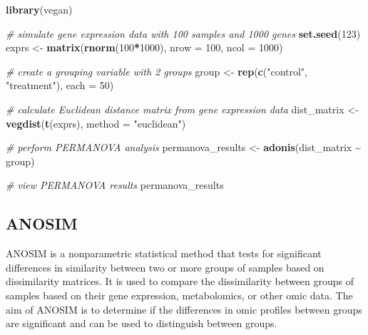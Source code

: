 \documentclass[
]{book}
\newenvironment{Shaded}{\begin{snugshade}}{\end{snugshade}}
\newcommand{\AttributeTok}[1]{\textcolor[rgb]{0.13,0.29,0.53}{#1}}
\newcommand{\CommentTok}[1]{\textcolor[rgb]{0.56,0.35,0.01}{\textit{#1}}}
\newcommand{\DecValTok}[1]{\textcolor[rgb]{0.00,0.00,0.81}{#1}}
\newcommand{\FunctionTok}[1]{\textcolor[rgb]{0.13,0.29,0.53}{\textbf{#1}}}
\newcommand{\NormalTok}[1]{#1}
\newcommand{\OtherTok}[1]{\textcolor[rgb]{0.56,0.35,0.01}{#1}}
\newcommand{\SpecialCharTok}[1]{\textcolor[rgb]{0.81,0.36,0.00}{\textbf{#1}}}
\newcommand{\StringTok}[1]{\textcolor[rgb]{0.31,0.60,0.02}{#1}}
\begin{document}
\small

\begin{Shaded}
\begin{Highlighting}[]
\FunctionTok{library}\NormalTok{(vegan)}

\CommentTok{\# simulate gene expression data with 100 samples and 1000 genes}
\FunctionTok{set.seed}\NormalTok{(}\DecValTok{123}\NormalTok{)}
\NormalTok{exprs }\OtherTok{\textless{}{-}} \FunctionTok{matrix}\NormalTok{(}\FunctionTok{rnorm}\NormalTok{(}\DecValTok{100}\SpecialCharTok{*}\DecValTok{1000}\NormalTok{), }\AttributeTok{nrow =} \DecValTok{100}\NormalTok{, }\AttributeTok{ncol =} \DecValTok{1000}\NormalTok{)}

\CommentTok{\# create a grouping variable with 2 groups}
\NormalTok{group }\OtherTok{\textless{}{-}} \FunctionTok{rep}\NormalTok{(}\FunctionTok{c}\NormalTok{(}\StringTok{"control"}\NormalTok{, }\StringTok{"treatment"}\NormalTok{), }\AttributeTok{each =} \DecValTok{50}\NormalTok{)}

\CommentTok{\# calculate Euclidean distance matrix from gene expression data}
\NormalTok{dist\_matrix }\OtherTok{\textless{}{-}} \FunctionTok{vegdist}\NormalTok{(}\FunctionTok{t}\NormalTok{(exprs), }\AttributeTok{method =} \StringTok{"euclidean"}\NormalTok{)}

\CommentTok{\# perform PERMANOVA analysis}
\NormalTok{permanova\_results }\OtherTok{\textless{}{-}} \FunctionTok{adonis}\NormalTok{(dist\_matrix }\SpecialCharTok{\textasciitilde{}}\NormalTok{ group)}

\CommentTok{\# view PERMANOVA results}
\NormalTok{permanova\_results}
\end{Highlighting}
\end{Shaded}

\normalsize

\hypertarget{anosim}{%
\subsection{ANOSIM}\label{anosim}}

ANOSIM is a nonparametric statistical method that tests for significant differences in similarity between two or more groups of samples based on dissimilarity matrices. It is used to compare the dissimilarity between groups of samples based on their gene expression, metabolomics, or other omic data. The aim of ANOSIM is to determine if the differences in omic profiles between groups are significant and can be used to distinguish between groups.

\small
\end{document}
